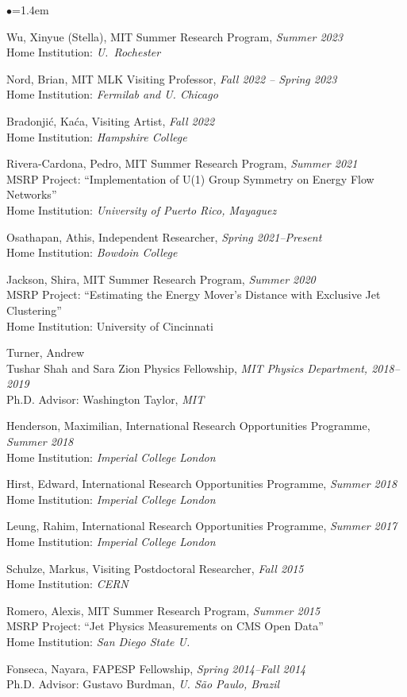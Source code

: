 \documentclass[11pt]{article}
\newcommand{\sh}{\phantom{.....}}
\newcommand{\bbl}{\begin{list}{$\bullet$}{\leftmargin=1.4em \itemsep=-1pt}}
\newcommand{\el}{\end{list}}
\begin{document}
\bbl 
\item Wu, Xinyue (Stella), MIT Summer Research Program, \textit{Summer 2023}
\\ \sh Home Institution: \textit{U.~Rochester}
\item Nord, Brian, MIT MLK Visiting Professor, \textit{Fall 2022 -- Spring 2023}
\\ \sh Home Institution: \textit{Fermilab and U. Chicago}
\item Bradonjić, Kaća, Visiting Artist, \textit{Fall 2022}
\\ \sh Home Institution: \textit{Hampshire College}
\item Rivera-Cardona, Pedro, MIT Summer Research Program, \textit{Summer 2021}
\\ \sh MSRP Project: ``Implementation of U(1) Group Symmetry on Energy Flow Networks''
\\ \sh Home Institution:  \textit{University of Puerto Rico, Mayaguez}
\item  Osathapan, Athis, Independent Researcher, \textit{Spring 2021--Present}
\\ \sh Home Institution: \textit{Bowdoin College}
\item Jackson, Shira, MIT Summer Research Program, \textit{Summer 2020}
\\ \sh MSRP Project: “Estimating the Energy Mover’s Distance with Exclusive Jet Clustering”
\\ \sh Home Institution: University of Cincinnati
\item  Turner, Andrew
\\ \sh Tushar Shah and Sara Zion Physics Fellowship, \textit{MIT Physics Department, 2018--2019}
\\ \sh    Ph.D. Advisor: Washington Taylor, \textit{MIT}
\item   Henderson, Maximilian, International Research Opportunities Programme, \textit{Summer 2018}
\\ \sh Home Institution: \textit{Imperial College London}
\item  Hirst, Edward, International Research Opportunities Programme, \textit{Summer 2018}
\\ \sh Home Institution: \textit{Imperial College London}
\item Leung, Rahim, International Research Opportunities Programme, \textit{Summer 2017}
\\ \sh Home Institution: \textit{Imperial College London}
\item Schulze, Markus, Visiting Postdoctoral Researcher, \textit{Fall 2015}
\\ \sh Home Institution:  \textit{CERN}
\item Romero, Alexis, MIT Summer Research Program, \textit{Summer 2015}
\\ \sh MSRP Project: ``Jet Physics Measurements on CMS Open Data''
\\ \sh Home Institution:  \textit{San Diego State U.}
\item Fonseca, Nayara, FAPESP Fellowship, \textit{Spring 2014--Fall 2014}
\\ \sh Ph.D. Advisor:  Gustavo Burdman, \textit{U. S\~ao Paulo, Brazil}
\el
\end{document}
